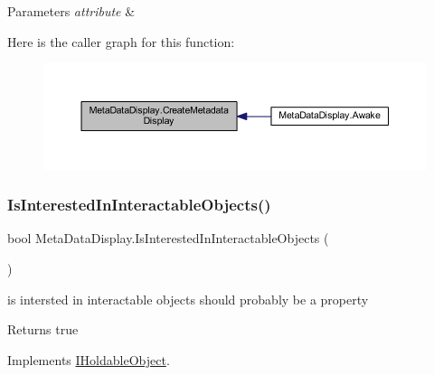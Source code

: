 \begin{DoxyParams}{Parameters}
{\em attribute} & \\
\hline
\end{DoxyParams}
Here is the caller graph for this function\+:\nopagebreak
\begin{figure}[H]
\begin{center}
\leavevmode
\includegraphics[width=350pt]{class_meta_data_display_a9306b452a284969cbca1414a034eb5c9_icgraph}
\end{center}
\end{figure}
\mbox{\label{class_meta_data_display_a6aa943864ef85667977a13c895c2ce23}} 
\subsubsection{\texorpdfstring{Is\+Interested\+In\+Interactable\+Objects()}{IsInterestedInInteractableObjects()}}
{\footnotesize\ttfamily bool Meta\+Data\+Display.\+Is\+Interested\+In\+Interactable\+Objects (\begin{DoxyParamCaption}{ }\end{DoxyParamCaption})}



is intersted in interactable objects should probably be a property 

\begin{DoxyReturn}{Returns}
true
\end{DoxyReturn}


Implements \mbox{\hyperlink{interface_i_holdable_object_a0356d534c17ab4e04fba00b42abeea77}{I\+Holdable\+Object}}.

\mbox{\label{class_meta_data_display_a274478924e6a4df19484a469ae2869ce}} 
